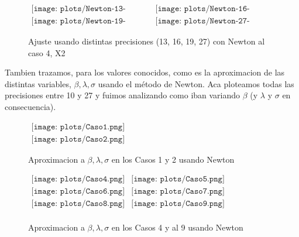 \begin{figure} [H]
$\begin{array}{cc}
\texttt{[image: plots/Newton-13-caso4.png]} &
\texttt{[image: plots/Newton-16-caso4.png]} \\
\texttt{[image: plots/Newton-19-caso4.png]} &
\texttt{[image: plots/Newton-27-caso4.png]}
\end{array}$
\caption{Ajuste usando distintas precisiones (13, 16, 19, 27) con Newton al caso 4, X2}
\label{fig:FitCaso4Newton}
\end{figure}


Tambien trazamos, para los valores conocidos, como es la aproximacion de las distintas variables, $\beta, \lambda, \sigma$ usando el m\'etodo de Newton.
Aca ploteamos todas las precisiones entre 10 y 27 y fuimos analizando como iban variando $\beta$ (y $\lambda$ y $\sigma$ en consecuencia).


\begin{figure}
$\begin{array}{c}
\texttt{[image: plots/Caso1.png]} \\
\texttt{[image: plots/Caso2.png]}
\end{array}$

\caption{Aproximacion a $\beta, \lambda, \sigma$ en los Casos 1 y 2 usando Newton}
\end{figure}

\begin{figure}
$\begin{array}{cc}
\texttt{[image: plots/Caso4.png]} &
\texttt{[image: plots/Caso5.png]} \\
\texttt{[image: plots/Caso6.png]} &
\texttt{[image: plots/Caso7.png]} \\
\texttt{[image: plots/Caso8.png]} &
\texttt{[image: plots/Caso9.png]} \\

\end{array}$

\caption{Aproximacion a $\beta, \lambda, \sigma$ en los Casos 4 y al 9 usando Newton}
\label{fig:AproxCaso1}
\end{figure}


